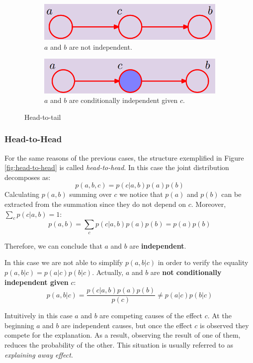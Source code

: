 \begin{figure}
\centering
\begin{subfigure}[t]{0.49\textwidth}
\centering
\includegraphics[width=\linewidth]{images/headToTail.png} 
\caption{$a$ and $b$ are not independent.}
\label{fig:unSelectedHeadToTail}
\end{subfigure}
\hfill
\begin{subfigure}[t]{0.49\textwidth}
\centering
\includegraphics[width=\linewidth]{images/headToTailSelected.png}
\caption{$a$ and $b$ are conditionally independent given $c$.}
\label{fig:selectedHeadToTail}
\end{subfigure}

\caption{Head-to-tail}
\label{fig:head-to-tail}
\end{figure}

\subsubsection{Head-to-Head}
For the same reasons of the previous cases, the structure exemplified in Figure \ref{fig:head-to-head} is called \textit{head-to-head}. In this case the joint distribution decomposes as:
$$p(a,b,c) = p(c|a,b)p(a)p(b)$$
Calculating $p(a,b)$ summing over $c$ we notice that $p(a)$ and $p(b)$ can be extracted from the summation since they do not depend on $c$. Moreover, $\sum_c p(c|a,b) = 1$:
$$p(a,b) = \sum_c p(c|a,b) p(a) p(b) = p(a)p(b)$$

Therefore, we can conclude that $a$ and $b$ are \textbf{independent}. \newline

In this case we are not able to simplify $p(a,b|c)$ in order to verify the equality $p(a,b|c) = p(a|c)p(b|c)$. Actually, $a$ and $b$ are \textbf{not conditionally independent given} $c$:
$$p(a,b|c) = \frac{p(c|a,b)p(a)p(b)}{p(c)} \neq p(a|c)p(b|c)$$

Intuitively in this case $a$ and $b$ are competing causes of the effect $c$. At the beginning $a$ and $b$ are independent causes, but once the effect $c$ is observed they compete for the explanation. As a result, observing the result of one of them, reduces the probability of the other. This situation is usually referred to as \textit{explaining away effect}. \newline

